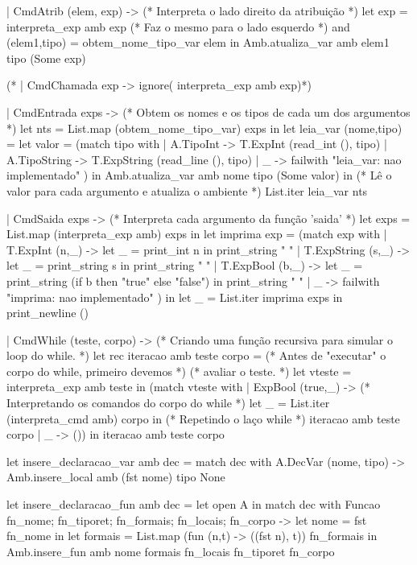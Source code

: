 \documentclass[12pt,a4paper,twoside]{article}
\begin{document}
\begin{terminal}
  | CmdAtrib (elem, exp) ->
    (* Interpreta o lado direito da atribuição *)
    let exp = interpreta_exp amb exp
    (* Faz o mesmo para o lado esquerdo *)
    and (elem1,tipo) = obtem_nome_tipo_var elem in
    Amb.atualiza_var amb elem1 tipo (Some exp)

 (* | CmdChamada exp -> ignore( interpreta_exp amb exp)*)

  | CmdEntrada exps ->
    (* Obtem os nomes e os tipos de cada um dos argumentos *)
    let nts = List.map (obtem_nome_tipo_var) exps in
    let leia_var (nome,tipo) =
      let valor =
        (match tipo with
         | A.TipoInt    -> T.ExpInt    (read_int (),  tipo)
         | A.TipoString -> T.ExpString (read_line (), tipo)
         | _ -> failwith "leia_var: nao implementado"
        )
      in  Amb.atualiza_var amb nome tipo (Some valor)
    in
    (* Lê o valor para cada argumento e atualiza o ambiente *)
    List.iter leia_var nts

  | CmdSaida exps ->
    (* Interpreta cada argumento da função 'saida' *)
    let exps = List.map (interpreta_exp amb) exps in
    let imprima exp =
      (match exp with
       | T.ExpInt (n,_) ->      let _ = print_int n in print_string " "
       | T.ExpString (s,_) -> let _ = print_string s in print_string " "
       | T.ExpBool (b,_) ->
         let _ = print_string (if b then "true" else "false")
         in print_string " "
       | _ -> failwith "imprima: nao implementado"
      )
    in
    let _ = List.iter imprima exps in
    print_newline ()

  | CmdWhile (teste, corpo) ->
      (* Criando uma função recursiva para simular o loop do while. *)
      let rec iteracao amb teste corpo =
          (* Antes de "executar" o corpo do while, primeiro devemos *)
          (* avaliar o teste.                                       *)
          let vteste = interpreta_exp amb teste in
         (match vteste with
          | ExpBool (true,_) ->
              (* Interpretando os comandos do corpo do while *)
              let _ = List.iter (interpreta_cmd amb) corpo in
              (* Repetindo o laço while *)
              iteracao amb teste corpo
          | _ -> ()) in
      iteracao amb teste corpo

let insere_declaracao_var amb dec =
    match dec with
        A.DecVar (nome, tipo) ->  Amb.insere_local amb (fst nome) tipo None

let insere_declaracao_fun amb dec =
  let open A in
    match dec with
      Funcao {fn_nome; fn_tiporet; fn_formais; fn_locais; fn_corpo} ->
        let nome = fst fn_nome in
        let formais = List.map (fun (n,t) -> ((fst n), t)) fn_formais in
        Amb.insere_fun amb nome formais fn_locais fn_tiporet fn_corpo


\end{terminal}
\end{document}
